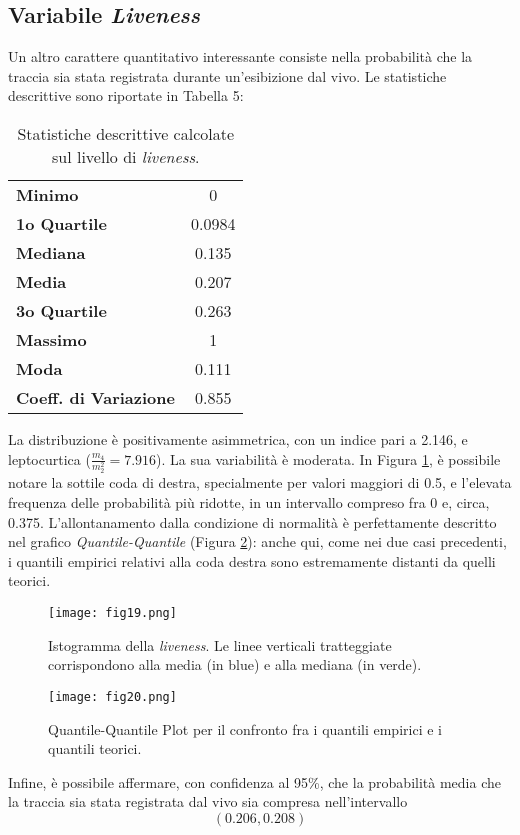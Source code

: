 \documentclass[fleqn,10pt]{SelfArx} %
\begin{document}
\subsection*{Variabile \textit{Liveness}}
Un altro carattere quantitativo interessante consiste nella probabilità che la traccia sia stata registrata durante un'esibizione dal vivo. Le statistiche descrittive sono riportate in Tabella 5:
{\begin{table}[H]
\centering

\begin{tabular}[t]{lc}
\toprule
\midrule
\textbf{Minimo}&0\\
\textbf{1o Quartile}&0.0984\\
\textbf{Mediana}&0.135\\
\textbf{Media}&0.207\\
\textbf{3o Quartile}&0.263\\
\textbf{Massimo}&1\\
\textbf{Moda}&0.111\\
\textbf{Coeff. di Variazione}&0.855\\
\bottomrule
\end{tabular}
\caption{Statistiche descrittive calcolate sul livello di \textit{liveness}.}
\end{table}}
La distribuzione è positivamente asimmetrica, con un indice pari a 2.146, e leptocurtica ($\frac{m_4}{m_2^{2}}=7.916$). La sua variabilità è moderata. In Figura \ref{fig:fig19}, è possibile notare la sottile coda di destra, specialmente per valori maggiori di 0.5, e l'elevata frequenza delle probabilità più ridotte, in un intervallo compreso fra 0 e, circa, 0.375. L'allontanamento dalla condizione di normalità è perfettamente descritto nel grafico \textit{Quantile-Quantile} (Figura \ref{fig:fig20}): anche qui, come nei due casi precedenti, i quantili empirici relativi alla coda destra sono estremamente distanti da quelli teorici.
\begin{figure}[H]
    \centering
    \texttt{[image: fig19.png]}
    \caption{Istogramma della \textit{liveness}. Le linee verticali tratteggiate corrispondono alla media (in blue) e alla mediana (in verde).}
    \label{fig:fig19}
\end{figure}
\begin{figure}[H]
    \centering
    \texttt{[image: fig20.png]}
    \caption{Quantile-Quantile Plot per il confronto fra i quantili empirici e i quantili teorici.}
    \label{fig:fig20}
\end{figure}
Infine, è possibile affermare, con confidenza al 95\%, che la probabilità media che la traccia sia stata registrata dal vivo sia compresa nell'intervallo
\begin{equation}
    (0.206, 0.208)
\end{equation}
\end{document}
